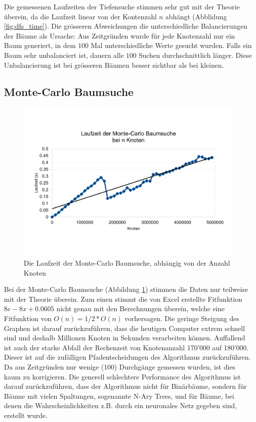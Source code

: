 \documentclass[a4paper,11pt]{article}
\begin{document}
Die gemessenen Laufzeiten der Tiefensuche stimmen sehr gut mit der Theorie überein, da die Laufzeit linear von der Kontenzahl $n$ abhängt (Abblidung \ref{fig:dfs_time}). Die grösseren Abweichungen die unterschiedliche Balancierungen der Bäume als Ursache: Aus Zeitgründen wurde für jede Knotenzahl nur ein Baum generiert, in dem $100$ Mal unterschiedliche Werte gesucht wurden. Falls ein Baum sehr unbalanciert ist, dauern alle $100$ Suchen durchschnittlich länger. Diese Unbalancierung ist bei grösseren Bäumen besser sichtbar als bei kleinen.

\subsection{Monte-Carlo Baumsuche}

	\begin{figure}[!htb]
		\centering
		\includegraphics[width=0.85\linewidth]{img/MCTS_size.pdf}
		\caption{Die Laufzeit der Monte-Carlo Baumsuche, abhängig von der Anzahl Knoten}
		\label{fig:mcts_time}
	\end{figure}
Bei der Monte-Carlo Baumsuche (Abbildung \ref{fig:mcts_time}) stimmen die Daten nur teilweise mit der Theorie überein. Zum einen stimmt die von Excel erstellte Fitfunktion $8e-8x+0.0605$ nicht genau mit den Berechnungen überein, welche eine Fitfunktion von $O(n) = 1/2*O(n)$ vorhersagen. Die geringe Steigung des Graphen ist darauf zurückzuführen, dass die heutigen Computer extrem schnell sind und deshalb Millionen Knoten in Sekunden verarbeiten können. Auffallend ist auch der starke Abfall der Rechenzeit von Knotenanzahl 170'000 auf 180'000. Dieser ist auf die zufälligen Pfadentscheidungen des Algorithmus zurückzuführen. Da aus Zeitgründen nur wenige (100) Durchgänge gemessen wurden, ist dies kaum zu korrigieren. Die generell schlechtere Performance des Algorithmus ist darauf zurückzuführen, dass der Algorithmus nicht für Binärbäume, sondern für Bäume mit vielen Spaltungen, sogenannte N-Ary Trees, und für Bäume, bei denen die Wahrscheinlichkeiten z.B. durch ein neuronales Netz gegeben sind, erstellt wurde.
\end{document}

